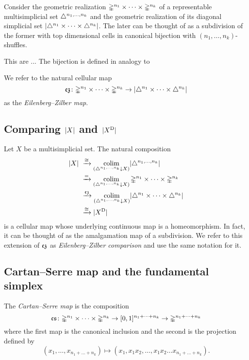 Consider the geometric realization $\mathbb{\Delta}^{n_1} \times \dots \times \mathbb{\Delta}^{n_k}$ of a representable multisimplicial set $\triangle^{n_1, \dots, n_k}$ and the geometric realization of its diagonal simplicial set $\lvert\triangle^{n_1} \times \dots \times \triangle^{n_k}\rvert$.
The later can be thought of as a subdivision of the former with top dimensional cells in canonical bijection with $(n_1, \dots, n_k)$-shuffles.

This are ... 
The bijection is defined in analogy to 

We refer to the natural cellular map
\[
\operatorname{\mathfrak{ez}} \colon
\mathbb{\Delta}^{n_1} \times \dots \times \mathbb{\Delta}^{n_k} \to
\lvert\triangle^{n_1} \times \dots \times \triangle^{n_k}\rvert
\]
as the \textit{Eilenberg--Zilber map}.

\subsection{Comparing $\lvert X\rvert$ and $\lvert X^{\mathrm{D}}\rvert$}

Let $X$ be a multisimplicial set.
The natural composition
\begin{equation} \label{e:ez comparison}
\begin{split}
\lvert X\rvert \ &\xrightarrow{\cong}
\operatorname*{colim}_{(\triangle^{n_1, \dots, n_k} \downarrow X)} \lvert\triangle^{n_1, \dots, n_k}\rvert \\ &\xrightarrow{=}
\operatorname*{colim}_{(\triangle^{n_1, \dots, n_k} \downarrow X)} \mathbb{\Delta}^{n_1} \times \dots \times \mathbb{\Delta}^{n_k} \\ &\xrightarrow{\operatorname{\mathfrak{ez}}}
\operatorname*{colim}_{(\triangle^{n_1, \dots, n_k} \downarrow X)} \lvert\triangle^{n_1} \times \dots \times \triangle^{n_k}\rvert \\ &\xrightarrow{\cong}
\lvert X^{\mathrm{D}}\rvert
\end{split}
\end{equation}
is a cellular map whose underlying continuous map is a homeomorphism.
In fact, it can be thought of as the amalgamation 
map of a subdivision.
We refer to this extension of $\operatorname{\mathfrak{ez}}$ as \textit{Eilenberg--Zilber comparison} and use the same notation for it.


\subsection{Cartan--Serre map and the fundamental simplex}

The \textit{Cartan--Serre map} is the composition
\[
\operatorname{\mathfrak{cs}} \colon
\mathbb{\Delta}^{n_1} \times \dots \times \mathbb{\Delta}^{n_k} \to
[0,1]^{n_1 + \dots + n_k} \to
\mathbb{\Delta}^{n_1 + \dots + n_k}
\]
where the first map is the canonical inclusion and the second is the projection defined by
\[
(x_1, \dots, x_{n_1 + \dots + n_k}) \mapsto (x_1, x_1x_2, \dots, x_1x_2 \dots x_{n_1 + \dots + n_k}).
\]

